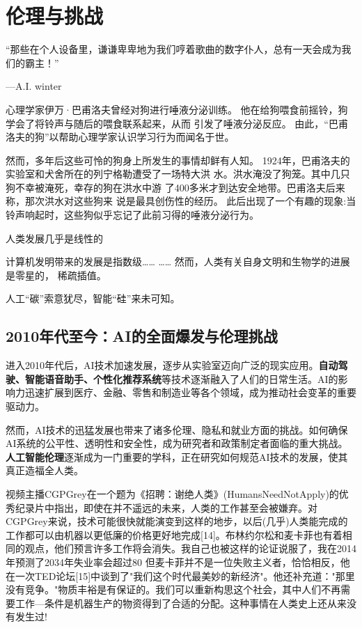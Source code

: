 \chapter{伦理与挑战}
“那些在个人设备里，谦谦卑卑地为我们哼着歌曲的数字仆人，总有一天会成为我们的霸主！”
\begin{flushright}
---A.I. winter
\end{flushright}

心理学家伊万·巴甫洛夫曾经对狗进行唾液分泌训练。
他在给狗喂食前摇铃，狗学会了将铃声与随后的喂食联系起来，从而
引发了唾液分泌反应。
由此，“巴甫洛夫的狗”以帮助心理学家认识学习行为而闻名于世。

然而，多年后这些可怜的狗身上所发生的事情却鲜有人知。
1924年，巴甫洛夫的实验室和犬舍所在的列宁格勒遭受了一场特大洪 水。洪水淹没了狗笼。其中几只狗不幸被淹死，幸存的狗在洪水中游 了400多米才到达安全地带。巴甫洛夫后来称，那次洪水对这些狗来 说是最具创伤性的经历。
此后出现了一个有趣的现象:当铃声响起时，这些狗似乎忘记了此前习得的唾液分泌行为。

人类发展几乎是线性的

计算机发明带来的发展是指数级……
……
然而，人类有关自身文明和生物学的进展是零星的， 稀疏插值。

人工“碳”索意犹尽，智能“硅”来未可知。

\section{2010年代至今：AI的全面爆发与伦理挑战}
进入2010年代后，AI技术加速发展，逐步从实验室迈向广泛的现实应用。{\bf 自动驾驶、智能语音助手、个性化推荐系统}等技术逐渐融入了人们的日常生活。AI的影响力迅速扩展到医疗、金融、零售和制造业等各个领域，成为推动社会变革的重要驱动力。

然而，AI技术的迅猛发展也带来了诸多伦理、隐私和就业方面的挑战。如何确保AI系统的公平性、透明性和安全性，成为研究者和政策制定者面临的重大挑战。{\bf 人工智能伦理}逐渐成为一门重要的学科，正在研究如何规范AI技术的发展，使其真正造福全人类。


视频主播CGPGrey在一个题为《招聘：谢绝人类》(HumansNeedNotApply)的优秀纪录片中指出，即使在并不遥远的未来，人类的工作甚至会被嫌弃。对CGPGrey来说，技术可能很快就能演变到这样的地步，以后(几乎)人类能完成的工作都可以由机器以更低廉的价格更好地完成[14]。布林约尔松和麦卡菲也有着相同的观点，他们预言许多工作将会消失。我自己也被这样的论证说服了，我在2014年预测了2034年失业率会超过80%
但麦卡菲并不是一位失败主义者，恰恰相反，他在一次TED论坛[15]中谈到了"我们这个时代最美妙的新经济"。他还补充道："那里没有竞争。"物质丰裕是有保证的。我们可以重新构思这个社会，其中人们不再需要工作---条件是机器生产的物资得到了合适的分配。这种事情在人类史上还从来没有发生过!

